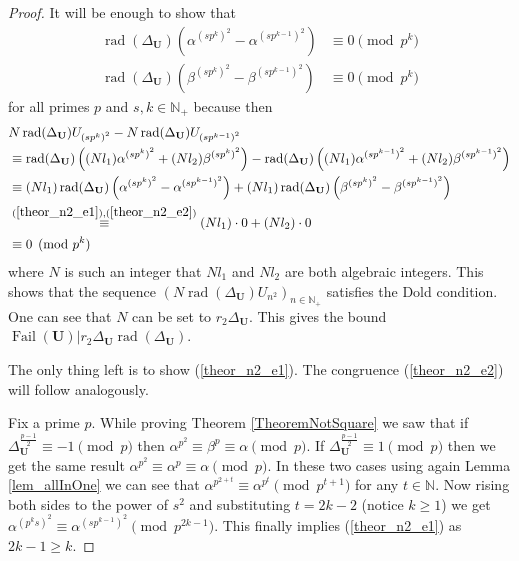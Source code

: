\documentclass[preprint,12pt]{elsarticle}
\newcommand{\N}{\mathbb{N}}
\newcommand{\raddel}{\rad(\Delta_\mathbf{U})}
\DeclareMathOperator{\rad}{rad}
\DeclareMathOperator{\fail}{Fail}
\begin{document}
\begin{proof}
It will be enough to show that 
\begin{align} \label{theor_n2_e1}
\raddel\left(\alpha^{{(sp^k)}^2} - \alpha^{{(sp^{k-1})}^2}\right)  &\equiv 0 \pmod{p^k} \\
\raddel\left(\beta^{{(sp^k)}^2} - \beta^{{(sp^{k-1})}^2}\right)  &\equiv 0 \pmod{p^k} \label{theor_n2_e2}
\end{align}
for all primes $p$ and $s, k \in \N_+$ because then 
\begin{align}
    & N\raddel U_{{(sp^k)}^2} - N\raddel{U}_{{(sp^{k-1})}^2} \\ &\equiv
    \raddel\left((Nl_1)\alpha^{{(sp^k)}^2} + (Nl_2)\beta^{{(sp^k)}^2}\right)
    - \raddel\left((Nl_1)\alpha^{{(sp^{k-1})}^2} + (Nl_2)\beta^{{(sp^{k-1})}^2}\right) \\ &\equiv
    (Nl_1)\raddel\left(\alpha^{{(sp^k)}^2} - \alpha^{{(sp^{k-1})}^2}\right)
    + (Nl_1)\raddel\left(\beta^{{(sp^k)}^2} - \beta^{{(sp^{k-1})}^2}\right)
    \\ &\overset{(\ref{theor_n2_e1}), (\ref{theor_n2_e2})}{\equiv} (Nl_1) \cdot 0 + (Nl_2) \cdot 0  
    \\&\equiv 0 \pmod{p^k}
\end{align}
where $N$ is such an integer that $Nl_1$ and $Nl_2$ are both algebraic integers. This shows that the sequence $(N\raddel {U}_{n^2})_{n\in\N_+}$ satisfies the Dold condition. One can see that $N$ can be set to $r_2\Delta_\mathbf{U}$. This gives the bound $\fail(\mathbf{U}) | r_2\Delta_\mathbf{U}\rad(\Delta_\mathbf{U})$.

The only thing left is to show (\ref{theor_n2_e1}). The congruence (\ref{theor_n2_e2}) will follow analogously.


Fix a prime $p$. While proving Theorem \ref{TheoremNotSquare} we saw that if $\Delta_\mathbf{U}^\frac{p-1}{2} \equiv -1 \pmod p$ then $\alpha^{p^2} \equiv \beta^p \equiv \alpha \pmod p$. If  $\Delta_\mathbf{U}^\frac{p-1}{2} \equiv 1 \pmod p$ then we get the same result $\alpha^{p^2} \equiv \alpha^p \equiv \alpha \pmod p$. In these two cases using again Lemma \ref{lem_allInOne}
 we can see that $\alpha^{p^{2+t}} \equiv \alpha^{p^t} \pmod{p^{t+1}}$ for any $t \in \N$. Now rising both sides to the power of $s^2$ and substituting $t = 2k-2$ (notice $k\geqslant 1$) we get $\alpha^{{(p^{k}s)}^2} \equiv \alpha^{{(sp^{k-1})}^2} \pmod{p^{2k-1}}$. This finally implies (\ref{theor_n2_e1}) as $2k-1 \geqslant k$.
 

\end{proof}
\end{document}
